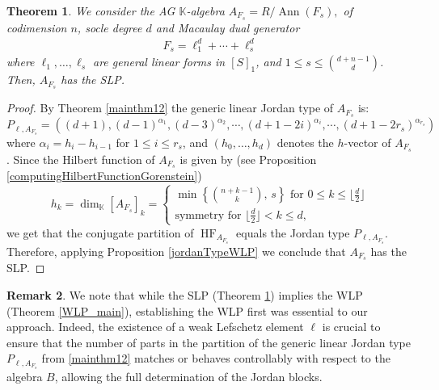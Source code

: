 \documentclass[12pt,twoside]{amsart}
\numberwithin{equation}{section} \hyphenation{semi-stable}
\newcommand{\K}{\mathbb{K}}
\DeclareMathOperator{\HF}{HF}
\newtheorem{theorem}{Theorem}[section]
\theoremstyle{definition}
\newtheorem{remark}[theorem]{Remark}
\begin{document}
\begin{theorem} \label{SLP_main}
We consider the AG $\K$-algebra $A_{F_{s}} = R/\operatorname{Ann}(F_{s}),$ of codimension $n$, socle degree $d$ and Macaulay dual generator 
\begin{eqnarray*}
F_{s}=\ell_1^d+\cdots+\ell_s^d
\end{eqnarray*}
where $\ell_1,\dots,\ell_s$ are general linear forms in $[S]_1$, and $1 \le s \le \binom{d+n-1}{d}$.                  
Then, $A_{F_s}$ has the SLP. 
\end{theorem}
\begin{proof} By Theorem \ref{mainthm12}  the generic linear Jordan type of $A_{F_s}$ is:
$$ P_{\ell,A_{F_s}}= ((d + 1), (d-1)^{\alpha_1},(d - 3)^{\alpha_2},\cdots,  (d+1-2i)^{\alpha _i}, \cdots , (d+1-2r_s)^{\alpha_{r_s}})$$
where $\alpha_i = h_i - h_{i-1}$ for $1 \le i \le r_s$, and $(h_0, \dots, h_d)$ denotes the $h$-vector of $A_{F_s}$.
Since the Hilbert function of $A_{F_s}$ is given by (see Proposition \ref{computingHilbertFunctionGorenstein})
$$
h_k=\dim_{\mathbb K}[A_{F_{s}}]_k
=\begin{cases}\min\left\{\binom{n+k-1}{k},\, s\right\} \text{ for }  0\leq k\leq\lfloor\frac{d}{2}\rfloor \\
\text{symmetry}  \text{ for } \lfloor\frac{d}{2}\rfloor < k \leq d  ,
\end{cases}
$$
we get that the conjugate partition
of $\HF_{A_{F_s}}$ equals the Jordan type $P_{\ell,A_{F_s}}$.
 Therefore,  applying Proposition \ref{jordanTypeWLP} we conclude that
$A_{F_s}$ has the SLP.
\end{proof}


\begin{remark} \label{WLPnecessity} 
We note that while the SLP (Theorem \ref{SLP_main}) implies the WLP (Theorem \ref{WLP_main}), establishing the WLP first was essential to our approach.
Indeed, the existence of a weak Lefschetz element $\ell$ is crucial to ensure that the number of parts in the partition of the generic linear Jordan type $P_{\ell, A_{F_s}}$ from \ref{mainthm12} matches or behaves controllably with respect to the algebra $B$, allowing the full determination of the Jordan blocks.
\end{remark}
\end{document}
